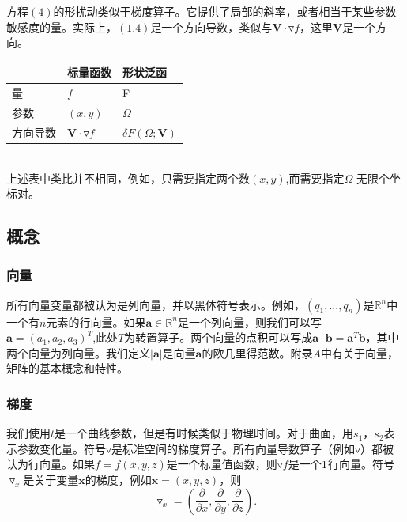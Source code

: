 \documentclass[12pt,a4paper]{article}
\numberwithin{equation}{section}
\begin{document}
方程$(4)$的形扰动类似于梯度算子。它提供了局部的斜率，或者相当于某些参数敏感度的量。实际上，$(1.4)$是一个方向导数，类似与$\mathbf{V} \cdot \triangledown f$，这里$\mathbf{V}$是一个方向。
\begin{tabular}{ |l|l|l|}   
\hline   
  &  标量函数 & 形状泛函 \\
\hline
量 & $f$ & F \\
\hline
参数 & $(x,y)$ & $\Omega$ \\
\hline
方向导数 & $\mathbf{V} \cdot \triangledown f$ &  $\delta F(\Omega;\mathbf{V})$ \\
\hline
\end{tabular}
\\


上述表中类比并不相同，例如，只需要指定两个数$(x,y)$,而需要指定$\Omega$	无限个坐标对。

\subsection{概念}
\subsubsection{向量}
所有向量变量都被认为是列向量，并以黑体符号表示。例如，$(q_1,...,q_n)$是$\mathbb{R}^n$中一个有$n$元素的行向量。如果$\mathbf{a}\in \mathbb{R}^n$是一个列向量，则我们可以写$\mathbf{a}=(a_1,a_2,a_3)^T$,此处$T$为转置算子。两个向量的点积可以写成$\mathbf{a} \cdot \mathbf{b}=\mathbf{a}^{T} \mathbf{b}$，其中两个向量为列向量。我们定义$|\mathbf{a}|$是向量$\mathbf{a}$的欧几里得范数。附录$A$中有关于向量，矩阵的基本概念和特性。
\subsubsection{梯度}
我们使用$t$是一个曲线参数，但是有时候类似于物理时间。对于曲面，用$s_1$，$s_2$表示参数变化量。符号$\triangledown$是标准空间的梯度算子。所有向量导数算子（例如$\triangledown$）都被认为行向量。如果$f=f(x,y,z)$是一个标量值函数，则$\triangledown f$是一个$1\time 3$行向量。符号$\triangledown _x$是关于变量$\mathbf{x}$的梯度，例如$\mathbf{x}=(x,y,z)$，则
$$
\triangledown _x=\left( \frac{\partial}{\partial x},\frac{\partial}{\partial y} ,\frac{\partial}{\partial z} \right).
$$
\end{document}
